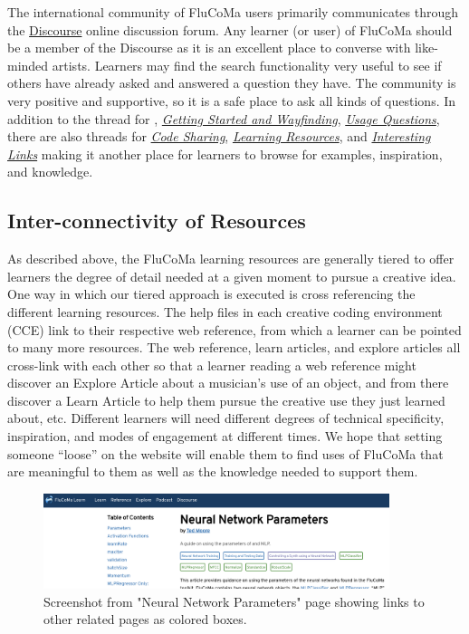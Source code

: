 \documentclass{article}
\begin{document}
The international community of FluCoMa users primarily communicates
through the \href{https://discourse.flucoma.org/}{Discourse} online
discussion forum. Any learner (or user) of FluCoMa should be a member of
the Discourse as it is an excellent place to converse with like-minded
artists. Learners may find the search functionality very useful to see
if others have already asked and answered a question they have. The
community is very positive and supportive, so it is a safe place to ask
all kinds of questions. In addition to the thread for
, \href{https://discourse.flucoma.org/c/getting-started-and-wayfinding}{\emph{Getting Started and Wayfinding}}, 
\href{https://discourse.flucoma.org/c/usage-questions}{\emph{Usage Questions}}, there are also threads for
\href{https://discourse.flucoma.org/c/code-sharing}{\emph{Code Sharing}},
\href{https://discourse.flucoma.org/c/learning-resources}{\emph{Learning Resources}}, and
\href{https://discourse.flucoma.org/c/interesting-links}{\emph{Interesting Links}} 
making it another place for learners to browse for examples,
inspiration, and knowledge.

\subsection{Inter-connectivity of
Resources}\label{inter-connectivity-of-resources}

As described above, the FluCoMa learning resources are generally tiered
to offer learners the degree of detail needed at a given moment to
pursue a creative idea. One way in which our tiered approach is executed
is cross referencing the different learning resources. The help files in
each creative coding environment (CCE) link to their respective web
reference, from which a learner can be pointed to many more resources.
The web reference, learn articles, and explore articles all cross-link
with each other so that a learner reading a web reference might discover
an Explore Article about a musician's use of an object, and from there
discover a Learn Article to help them pursue the creative use they just
learned about, etc. Different learners will need different degrees of
technical specificity, inspiration, and modes of engagement at different
times. We hope that setting someone ``loose'' on the website will enable
them to find uses of FluCoMa that are meaningful to them as well as the
knowledge needed to support them.

\begin{figure}[H]
\centering
\includegraphics[width=0.9\textwidth]{./figures/interconnected-resources.png}
\caption{Screenshot from "Neural Network Parameters" page showing links to other related pages as colored boxes.}
\label{fig:interconnected-resources}
\end{figure}
\end{document}
